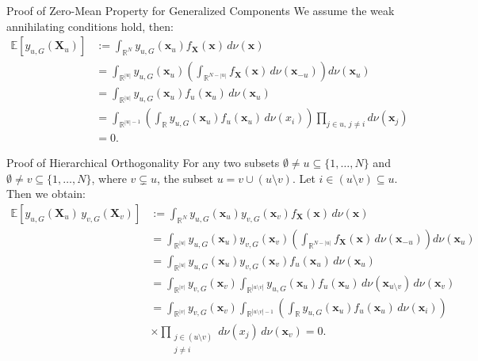 \begin{frame}{Proof of Zero-Mean Property for Generalized Components}
  We assume the weak annihilating conditions hold, then:
  \begin{align*}
\mathbb{E}[y_{u,G}(\boldsymbol{X}_u)] 
&:= \int_{\mathbb{R}^N} y_{u,G}(\boldsymbol{x}_u) f_{\boldsymbol{X}}(\boldsymbol{x})\, d \nu (\boldsymbol{x}) \\[0.5em]
&= \int_{\mathbb{R}^{|u|}} y_{u,G}(\boldsymbol{x}_u) \left( \int_{\mathbb{R}^{N - |u|}} f_{\boldsymbol{X}}(\boldsymbol{x}) \, d \nu(\boldsymbol{x}_{-u}) \right) d \nu(\boldsymbol{x}_u) \\[0.5em]
&= \int_{\mathbb{R}^{|u|}} y_{u,G}(\boldsymbol{x}_u) f_u(\boldsymbol{x}_u)\, d \nu(\boldsymbol{x}_u) \\[0.5em]
&= \int_{\mathbb{R}^{|u| - 1}} \left( \int_{\mathbb{R}} y_{u,G}(\boldsymbol{x}_u) f_u(\boldsymbol{x}_u) \, d \nu(x_i) \right) \prod_{j \in u,\, j \ne i} d \nu(\boldsymbol{x}_j) \\[0.5em]
&= 0.
\end{align*}
  
\end{frame}

\begin{frame}{Proof of Hierarchical Orthogonality}
For any two subsets $\emptyset \ne u \subseteq \{1,\dots,N\}$ and $\emptyset \ne v \subseteq \{1,\dots,N\}$, where $v \subsetneq u$, the subset $u = v \cup (u \setminus v)$. Let $i \in (u \setminus v) \subseteq u$. Then we obtain:
\begin{align*}
\mathbb{E}[y_{u,G}(\boldsymbol{X}_u) \, y_{v,G}(\boldsymbol{X}_v)]
&:= \int_{\mathbb{R}^N} y_{u,G}(\boldsymbol{x}_u) y_{v,G}(\boldsymbol{x}_v) f_{\boldsymbol{X}}(\boldsymbol{x}) \, d \nu(\boldsymbol{x}) \\[0.5em]
&= \int_{\mathbb{R}^{|u|}} y_{u,G}(\boldsymbol{x}_u) y_{v,G}(\boldsymbol{x}_v) \left( \int_{\mathbb{R}^{N - |u|}} f_{\boldsymbol{X}}(\boldsymbol{x}) \, d \nu(\boldsymbol{x}_{-u}) \right) d \nu(\boldsymbol{x}_u) \\[0.5em]
&= \int_{\mathbb{R}^{|u|}} y_{u,G}(\boldsymbol{x}_u) y_{v,G}(\boldsymbol{x}_v) f_u(\boldsymbol{x}_u) \, d \nu(\boldsymbol{x}_u) \\[0.5em]
&= \int_{\mathbb{R}^{|v|}} y_{v,G}(\boldsymbol{x}_v)
    \int_{\mathbb{R}^{|u \setminus v|}} y_{u,G}(\boldsymbol{x}_u) f_u(\boldsymbol{x}_u) \, d \nu(\boldsymbol{x}_{u \setminus v}) \, d \nu(\boldsymbol{x}_v) \\[0.5em]
&= \int_{\mathbb{R}^{|v|}} y_{v,G}(\boldsymbol{x}_v)
    \int_{\mathbb{R}^{|u \setminus v| - 1}} \left( \int_{\mathbb{R}} y_{u,G}(\boldsymbol{x}_u) f_u(\boldsymbol{x}_u) \, d \nu(\boldsymbol{x}_i) \right) \\[0.5em]
&\times \prod_{\substack{j \in (u \setminus v) \\ j \ne i}} d \nu(x_j) \, d \nu(\boldsymbol{x}_v) = 0.
\end{align*}
\end{frame}

